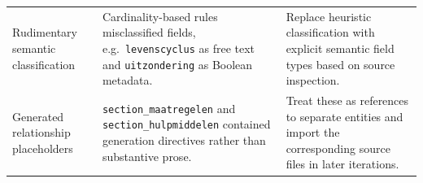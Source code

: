 \begin{longtable}{
    P{0.20\textwidth}
    P{0.37\textwidth}
    P{0.34\textwidth}
}
Rudimentary semantic classification &
Cardinality-based rules misclassified fields, e.g.\ \texttt{levenscyclus} as free text and \texttt{uitzondering} as Boolean metadata. &
Replace heuristic classification with explicit semantic field types based on source inspection. \\

Generated relationship placeholders &
\texttt{section\_maatregelen} and \texttt{section\_hulpmiddelen} contained generation directives rather than substantive prose. &
Treat these as references to separate entities and import the corresponding source files in later iterations. \\

\end{longtable}
\endgroup
